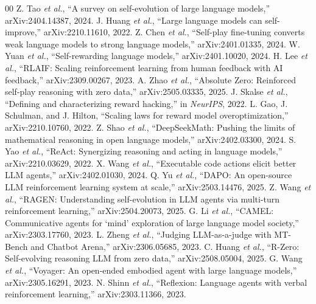 \documentclass[twocolumn,a4paper]{ctexart}
\begin{document}
\begin{thebibliography}{00}
 Z. Tao \emph{et al.}, ``A survey on self-evolution of large language models,'' arXiv:2404.14387, 2024.
 J. Huang \emph{et al.}, ``Large language models can self-improve,'' arXiv:2210.11610, 2022.
 Z. Chen \emph{et al.}, ``Self-play fine-tuning converts weak language models to strong language models,'' arXiv:2401.01335, 2024.
 W. Yuan \emph{et al.}, ``Self-rewarding language models,'' arXiv:2401.10020, 2024.
 H. Lee \emph{et al.}, ``RLAIF: Scaling reinforcement learning from human feedback with AI feedback,'' arXiv:2309.00267, 2023.
 A. Zhao \emph{et al.}, ``Absolute Zero: Reinforced self-play reasoning with zero data,'' arXiv:2505.03335, 2025.
 J. Skalse \emph{et al.}, ``Defining and characterizing reward hacking,'' in \emph{NeurIPS}, 2022.
 L. Gao, J. Schulman, and J. Hilton, ``Scaling laws for reward model overoptimization,'' arXiv:2210.10760, 2022.
 Z. Shao \emph{et al.}, ``DeepSeekMath: Pushing the limits of mathematical reasoning in open language models,'' arXiv:2402.03300, 2024.
 S. Yao \emph{et al.}, ``ReAct: Synergizing reasoning and acting in language models,'' arXiv:2210.03629, 2022.
 X. Wang \emph{et al.}, ``Executable code actions elicit better LLM agents,'' arXiv:2402.01030, 2024.
 Q. Yu \emph{et al.}, ``DAPO: An open-source LLM reinforcement learning system at scale,'' arXiv:2503.14476, 2025.
 Z. Wang \emph{et al.}, ``RAGEN: Understanding self-evolution in LLM agents via multi-turn reinforcement learning,'' arXiv:2504.20073, 2025.
 G. Li \emph{et al.}, ``CAMEL: Communicative agents for `mind' exploration of large language model society,'' arXiv:2303.17760, 2023.
 L. Zheng \emph{et al.}, ``Judging LLM-as-a-judge with MT-Bench and Chatbot Arena,'' arXiv:2306.05685, 2023.
 C. Huang \emph{et al.}, ``R-Zero: Self-evolving reasoning LLM from zero data,'' arXiv:2508.05004, 2025.
 G. Wang \emph{et al.}, ``Voyager: An open-ended embodied agent with large language models,'' arXiv:2305.16291, 2023.
 N. Shinn \emph{et al.}, ``Reflexion: Language agents with verbal reinforcement learning,'' arXiv:2303.11366, 2023.
\end{thebibliography}
\end{document}

